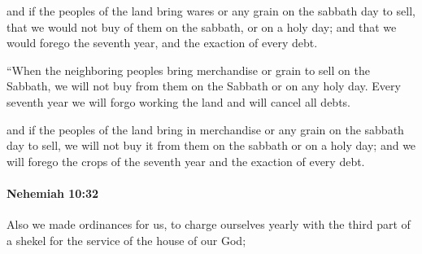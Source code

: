 			\begin{versebox}
					\item[BHS] 
					\item[LXX] 
					\item[ASV] and if the peoples of the land bring wares or any grain on the sabbath day to sell, that we would not buy of them on the sabbath, or on a holy day; and that we would forego the seventh year, and the exaction of every debt.
					\item[NIV] “When the neighboring peoples bring merchandise or grain to sell on the Sabbath, we will not buy from them on the Sabbath or on any holy day. Every seventh year we will forgo working the land and will cancel all debts.
					\item[NRSV] and if the peoples of the land bring in merchandise or any grain on the sabbath day to sell, we will not buy it from them on the sabbath or on a holy day; and we will forego the crops of the seventh year and the exaction of every debt.
			\end{versebox}

		\paragraph{Nehemiah 10:32} %
			\label{NEHEMIAH-10-32}

			Also we made ordinances for us, to charge ourselves yearly with the third part of a shekel for the service of the house of our God;

